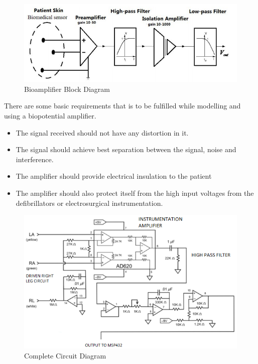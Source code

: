 \documentclass[11pt,a4paper,headinclude=false,footinclude=false]{scrreprt}
\begin{document}
\begin{figure}[H]
\includegraphics{Images/Hardware/BioamplifierBlockDiagram.png}
\centering
\caption{Bioamplifier Block Diagram}
\label{bioBlock}
\end{figure}

There are some basic requirements that is to be fulfilled while
modelling and using a biopotential amplifier.

\begin{itemize}
\item The signal received should not have any distortion in it.
\item The signal should achieve best separation between the signal, noise and
interference.
\item The amplifier should provide electrical insulation to the patient
\item The amplifier should also protect itself from the high input voltages from
the defibrillators or electrosurgical instrumentation.
\end{itemize}

\begin{figure}[H]
\includegraphics{Images/Hardware/CircuitDiagram.png}
\centering
\caption{Complete Circuit Diagram}
\label{circuitdiagram}
\end{figure}
\end{document}
